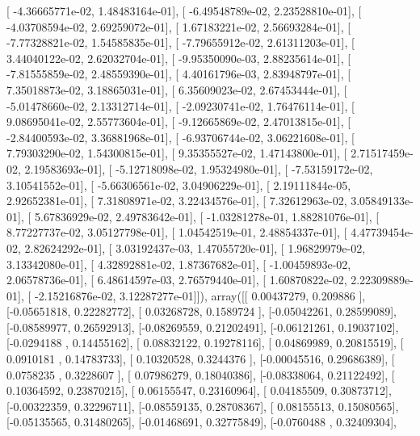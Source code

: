 \documentclass{article}
\begin{document}
       [ -4.36665771e-02,   1.48483164e-01],
       [ -6.49548789e-02,   2.23528810e-01],
       [ -4.03708594e-02,   2.69259072e-01],
       [  1.67183221e-02,   2.56693284e-01],
       [ -7.77328821e-02,   1.54585835e-01],
       [ -7.79655912e-02,   2.61311203e-01],
       [  3.44040122e-02,   2.62032704e-01],
       [ -9.95350090e-03,   2.88235614e-01],
       [ -7.81555859e-02,   2.48559390e-01],
       [  4.40161796e-03,   2.83948797e-01],
       [  7.35018873e-02,   3.18865031e-01],
       [  6.35609023e-02,   2.67453444e-01],
       [ -5.01478660e-02,   2.13312714e-01],
       [ -2.09230741e-02,   1.76476114e-01],
       [  9.08695041e-02,   2.55773604e-01],
       [ -9.12665869e-02,   2.47013815e-01],
       [ -2.84400593e-02,   3.36881968e-01],
       [ -6.93706744e-02,   3.06221608e-01],
       [  7.79303290e-02,   1.54300815e-01],
       [  9.35355527e-02,   1.47143800e-01],
       [  2.71517459e-02,   2.19583693e-01],
       [ -5.12718098e-02,   1.95324980e-01],
       [ -7.53159172e-02,   3.10541552e-01],
       [ -5.66306561e-02,   3.04906229e-01],
       [  2.19111844e-05,   2.92652381e-01],
       [  7.31808971e-02,   3.22434576e-01],
       [  7.32612963e-02,   3.05849133e-01],
       [  5.67836929e-02,   2.49783642e-01],
       [ -1.03281278e-01,   1.88281076e-01],
       [  8.77227737e-02,   3.05127798e-01],
       [  1.04542519e-01,   2.48854337e-01],
       [  4.47739454e-02,   2.82624292e-01],
       [  3.03192437e-03,   1.47055720e-01],
       [  1.96829979e-02,   3.13342080e-01],
       [  4.32892881e-02,   1.87367682e-01],
       [ -1.00459893e-02,   2.06578736e-01],
       [  6.48614597e-03,   2.76579440e-01],
       [  1.60870822e-02,   2.22309889e-01],
       [ -2.15216876e-02,   3.12287277e-01]]), array([[ 0.00437279,  0.209886  ],
       [-0.05651818,  0.22282772],
       [ 0.03268728,  0.1589724 ],
       [-0.05042261,  0.28599089],
       [-0.08589977,  0.26592913],
       [-0.08269559,  0.21202491],
       [-0.06121261,  0.19037102],
       [-0.0294188 ,  0.14455162],
       [ 0.08832122,  0.19278116],
       [ 0.04869989,  0.20815519],
       [ 0.0910181 ,  0.14783733],
       [ 0.10320528,  0.3244376 ],
       [-0.00045516,  0.29686389],
       [ 0.0758235 ,  0.3228607 ],
       [ 0.07986279,  0.18040386],
       [-0.08338064,  0.21122492],
       [ 0.10364592,  0.23870215],
       [ 0.06155547,  0.23160964],
       [ 0.04185509,  0.30873712],
       [-0.00322359,  0.32296711],
       [-0.08559135,  0.28708367],
       [ 0.08155513,  0.15080565],
       [-0.05135565,  0.31480265],
       [-0.01468691,  0.32775849],
       [-0.0760488 ,  0.32409304],
\end{document}
